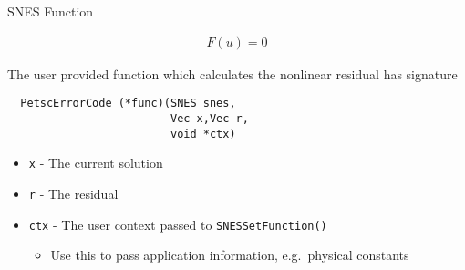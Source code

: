 \begin{frame}[fragile]{SNES Function}

\begin{align*}
 F(u) = 0
\end{align*}

The user provided function which calculates the nonlinear residual has signature
\begin{lstlisting}
  PetscErrorCode (*func)(SNES snes,
                         Vec x,Vec r,
                         void *ctx)
\end{lstlisting}

\begin{itemize}
  \item \lstinline|x| - The current solution
  \item \lstinline|r| - The residual
  \item \lstinline|ctx| -  The user context passed to \lstinline|SNESSetFunction()|
  \begin{itemize}
    \item Use this to pass application information, e.g.~physical constants
  \end{itemize}
\end{itemize}

\end{frame}
